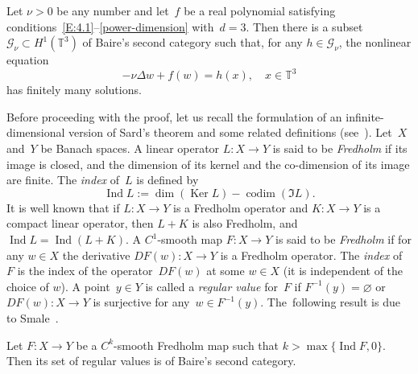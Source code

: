 \documentclass[JEP,XML,SOM,Unicode,ThmDefs]{cedram}
\let\mathcal\mathscr
\theoremstyle{plain}
\numberwithin{equation}{section}
\newcommand{\T}{{\mathbb T}}
\DeclareMathOperator{\Ker}{Ker}
\DeclareMathOperator{\Ind}{Ind}
\DeclareMathOperator{\codim}{codim}
\newcommand{\GG}{{\mathcal G}}
\begin{document}
\label{S:5.3}

\begin{proposition}\label{P:5.3}
Let $\nu>0$ be any number and let~$f$ be a real polynomial satisfying conditions~\eqref{E:4.1}--\eqref{power-dimension} with~$d=3$. Then there is a subset $\GG_\nu\subset H^1(\T^3)$ of Baire's second category such that, for any $h\in \GG_\nu$, the nonlinear equation\vspace*{-3pt}
\begin{equation} \label{stationary-eq3}
-\nu\Delta w+f(w)=h(x), \quad x\in\T^3
\end{equation}
has finitely many solutions.
\end{proposition}

Before proceeding with the proof, let us recall the formulation of an infinite-dimensional version of Sard's theorem and some related definitions (see~\cite{smale-1965}). Let~$X$ and~$Y$ be Banach spaces. A linear operator $L:X\to Y$ is said to be \emph{Fredholm} if its image is closed, and the dimension of its kernel and the co-dimension of its image are finite. The \emph{index} of~$L$ is defined by
\[
\Ind L:= \dim (\Ker L)- \codim(\Im L).
\]
It is well known that if $L:X\to Y$ is a Fredholm operator and $K:X\to Y$ is a compact linear operator, then $L+K$ is also Fredholm, and $\Ind L=\Ind(L+K)$. A $C^1$-smooth map $F:X\to Y$ is said to be \emph{Fredholm} if for any $w\in X$ the derivative $DF(w):X\to Y$ is a Fredholm operator. The \emph{index} of~$F$ is the index of the operator~$DF(w)$ at some $w\in X$ (it is independent of the choice of $w$). A point~$y\in Y$ is called a \emph{regular value} for~$F$ if $F^{-1}(y)=\varnothing$ or $DF(w):X\to Y$ is surjective for any~$w\in F^{-1}(y)$. The~following result is due to Smale~\cite[Cor.\,1.5]{smale-1965}.

\begin{theorem}\label{T:5.4}
Let $F:X\to Y$ be a $C^k$-smooth Fredholm map such that $k>\max \{\Ind F,0\}$. Then its set of regular values is of Baire's second category.
\end{theorem}
\end{document}
